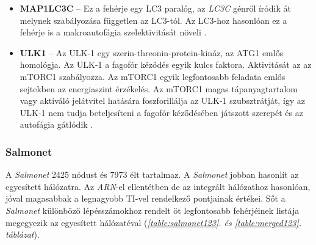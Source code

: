 \documentclass[a4paper,12pt]{article}
\begin{document}
\begin{itemize}
					\item \textbf{MAP1LC3C} -- Ez a fehérje egy LC3 paralóg, az \textit{LC3C} génről íródik át melynek szabályozása független az LC3-tól. Az LC3-hoz hasonlóan ez a fehérje is a makroautofágia szelektivitását növeli \cite{atg8_like}.
					
					\item \textbf{ULK1} -- Az ULK-1 egy szerin-threonin-protein-kináz, az ATG1 emlős homológja. Az ULK-1 a fagofór kéződés egyik kulcs faktora. Aktivitását az az mTORC1 szabályozza. Az mTORC1 egyik legfontosabb feladata emlős sejtekben az energiaszint érzékelés. Az mTORC1 magas tápanyagtartalom vagy aktiváló jelátvitel hatására foszforillálja az ULK-1 szubsztrátját, így az ULK-1 nem tudja beteljesíteni a fagofór kéződésében játszott szerepét és az autofágia gátlódik \cite{autophagy_proteins}. 
				\end{itemize}
				
		
		\subsubsection{Salmonet}
		
				A \textit{Salmonet} 2425 nódust és 7973 élt tartalmaz. A \textit{Salmonet} jobban hasonlít az egyesített hálózatra. Az \textit{ARN}-el ellentétben de az integrált hálózathoz hasonlóan, jóval  magasabbak a legnagyobb TI-vel rendelkező pontjainak értékei. Sőt a \textit{Salmonet} különböző lépésszámokhoz rendelt öt legfontosabb fehérjéinek listája megegyezik az egyesített hálózatéval (\textit{\ref{table:salmonet123}. és \ref{table:merged123}. táblázat}). 
										
\end{document}
